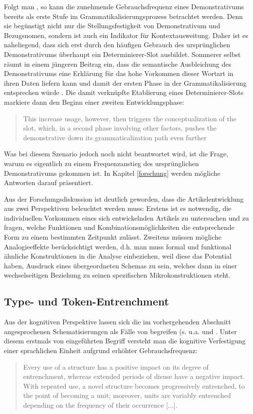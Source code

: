 Folgt man \textcite[194]{Himmelmann1997}, so kann die zunehmende Gebrauchsfrequenz eines Demonstrativums bereits als erste Stufe im Grammatikalisierungsprozess betrachtet werden. Denn sie begünstigt nicht nur die Stellungsfestigkeit von Demonstrativum und Bezugsnomen, sondern ist auch ein Indikator für Kontextausweitung. Daher ist es naheliegend, dass sich erst durch den häufigen Gebrauch des ursprünglichen Demonstrativums überhaupt  ein Determinierer-Slot ausbildet. Sommerer selbst räumt in einem jüngeren Beitrag ein, dass die semantische Ausbleichung des Demonstrativums eine Erklärung für das hohe Vorkommen dieser Wortart in ihren Daten liefern kann und damit der ersten Phase in der Grammatikalisierung entsprechen würde \parencite[127]{Sommerer2015}. Die damit verknüpfte Etablierung eines Determinierer-Slots markiere dann den Beginn einer zweiten Entwicklungsphase: \blockcquote[127]{Sommerer2015}{This increase usage, however, then triggers the conceptualization of the slot, which, in a second phase involving other factors, pushes the demonstrative down its grammaticalization path even further}. 
Was bei diesem Szenario jedoch noch nicht beantwortet wird, ist die Frage, warum es eigentlich zu einem Frequenzanstieg des ursprünglichen Demonstrativums gekommen ist. In Kapitel \ref{forschung} werden mögliche Antworten darauf präsentiert. 


Aus der Forschungsdiskussion ist deutlich geworden, dass die Artikelentwicklung aus zwei Perspektiven beleuchtet werden muss:  Erstens ist es notwendig, die individuellen Vorkommen eines sich entwickelnden Artikels zu untersuchen und zu fragen, welche Funktionen und Kombinationsmöglichkeiten die entsprechende Form zu einem bestimmten Zeitpunkt zulässt. Zweitens müssen mögliche Analogieeffekte berücksichtigt werden, d.h. man muss formal und funktional ähnliche Konstruktionen in die Analyse einbeziehen, weil diese das Potential haben, Ausdruck eines übergeordneten Schemas zu sein, welches dann in einer wechselseitigen Beziehung zu seinen spezifischen Mikrokonstruktionen steht. 

\subsection{Type- und Token-Entrenchment}\label{sec:entrenchment}

\begin{sloppypar}Aus der kognitiven Perspektive lassen sich die im vorhergehenden Abschnitt angesprochenen Schematisierungen als Fälle von  begreifen (s. u.a. \citealt{Langacker1987,Langacker2008,Goldberg1995,Goldberg2006,Bybee2006,Bybee2010} und \citealt{Schmid2007,Schmid2016}. 
Unter diesem erstmals von \citeauthor{Langacker1987} eingeführten Begriff versteht man die kognitive Verfestigung einer sprachlichen Einheit aufgrund erhöhter Gebrauchsfrequenz:\end{sloppypar}\blockcquote[59]{Langacker1987}{Every use of a structure has a positive impact on its degree of entrenchment, whereas extended periods of disuse have a negative impact. With repeated use, a novel structure becomes progressively entrenched, to the point of becoming a unit; moreover, units are variably entrenched depending on the frequency of their occurrence [...].} 

